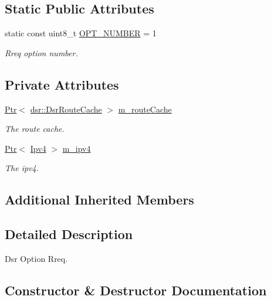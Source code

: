 \subsection*{Static Public Attributes}
\begin{DoxyCompactItemize}
\item 
static const uint8\+\_\+t \hyperlink{classns3_1_1dsr_1_1DsrOptionRreq_a4f38d14b0638b1e527c4141f1c8795e3}{O\+P\+T\+\_\+\+N\+U\+M\+B\+ER} = 1
\begin{DoxyCompactList}\small\item\em Rreq option number. \end{DoxyCompactList}\end{DoxyCompactItemize}
\subsection*{Private Attributes}
\begin{DoxyCompactItemize}
\item 
\hyperlink{classns3_1_1Ptr}{Ptr}$<$ \hyperlink{classns3_1_1dsr_1_1DsrRouteCache}{dsr\+::\+Dsr\+Route\+Cache} $>$ \hyperlink{classns3_1_1dsr_1_1DsrOptionRreq_a5b3482123ab67e592dc9a5ac7db70c3d}{m\+\_\+route\+Cache}
\begin{DoxyCompactList}\small\item\em The route cache. \end{DoxyCompactList}\item 
\hyperlink{classns3_1_1Ptr}{Ptr}$<$ \hyperlink{classns3_1_1Ipv4}{Ipv4} $>$ \hyperlink{classns3_1_1dsr_1_1DsrOptionRreq_a1cdb6d76fdbe652b4bb48e46e7aeb5d2}{m\+\_\+ipv4}
\begin{DoxyCompactList}\small\item\em The ipv4. \end{DoxyCompactList}\end{DoxyCompactItemize}
\subsection*{Additional Inherited Members}


\subsection{Detailed Description}
Dsr Option Rreq. 

\subsection{Constructor \& Destructor Documentation}
